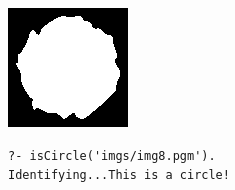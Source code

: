 \documentclass{article}
\begin{document}
\begin{center}
\includegraphics[scale=1.00]{texImgs/img8.eps}
\end{center}

\begin{center}
\begin{minipage}{6cm}
\begin{Verbatim}
?- isCircle('imgs/img8.pgm').
Identifying...This is a circle!
\end{Verbatim}
\end{minipage}
\end{center}
\end{document}
